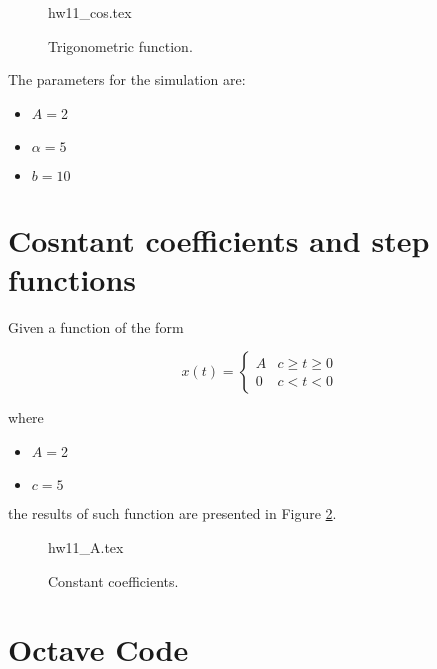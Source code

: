 \documentclass[a4paper,12pt]{article}
\begin{document}
\begin{figure}[htb!]
\centering
{hw11_cos.tex}
\caption{Trigonometric function.}
\label{fig: cos}
\end{figure}

The parameters for the simulation are:
\begin{itemize}
 \item $A = $2
 \item $\alpha = 5$
 \item $b = 10$
\end{itemize}


\newpage
\pagebreak

\section{Cosntant coefficients and step functions}

Given a function of the form

\begin{equation*}
 x(t) = \begin{cases}
         A &  c \geq t \geq 0\\
         0 & c < t < 0
        \end{cases}
\end{equation*}

where

\begin{itemize}
 \item $A = $2
 \item $c = 5$
\end{itemize}

the results of such function are presented in Figure \ref{fig: A}.


\begin{figure}[htb!]
\centering
{hw11_A.tex}
\caption{Constant coefficients.}
\label{fig: A}
\end{figure}


\newpage
\pagebreak
\appendix
\section{Octave Code}

\end{document}
